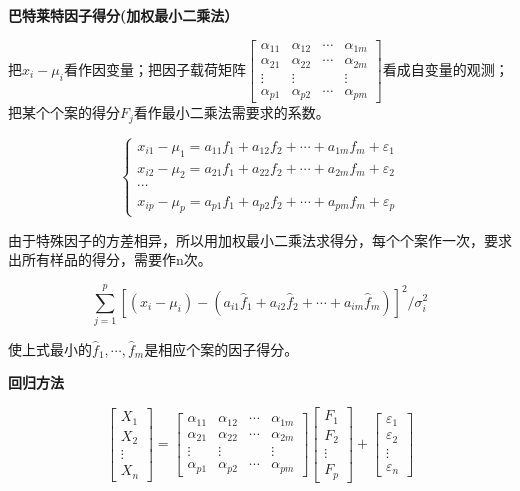 \documentclass[]{ctexbook}
\begin{document}
\textbf{巴特莱特因子得分(加权最小二乘法）}

把\(x_i-\mu_i\)看作因变量；把因子载荷矩阵\(\begin {bmatrix}\alpha_{11}&\alpha_{12}&\cdots&\alpha_{1m}\\\alpha_{21}&\alpha_{22}&\cdots&\alpha_{2m}\\\vdots&\vdots&&\vdots\\\alpha_{p1}&\alpha_{p2}&\cdots&\alpha_{pm} \end {bmatrix}\)看成自变量的观测；把某个个案的得分\(F_j\)看作最小二乘法需要求的系数。

\[\begin {cases}x_{i1}-\mu_1=a_{11}f_1+a_{12}f_2+\cdots+a_{1m}f_m+\varepsilon_1\\x_{i2}-\mu_2=a_{21}f_1+a_{22}f_2+\cdots+a_{2m}f_m+\varepsilon_2\\\cdots\\x_{ip}-\mu_p=a_{p1}f_1+a_{p2}f_2+\cdots+a_{pm}f_m+\varepsilon_p \end {cases}\]

由于特殊因子的方差相异，所以用加权最小二乘法求得分，每个个案作一次，要求出所有样品的得分，需要作n次。

\[\sum_{j=1}^p[(x_i-\mu_i)-(a_{i1}\hat f_1+a_{i2}\hat f_2+\cdots+a_{im}\hat f_m)]^2/\sigma_i^2\]

使上式最小的\(\hat f_1,\cdots,\hat f_m\)是相应个案的因子得分。

\textbf{回归方法}

\[\begin {bmatrix}X_1\\X_2\\\vdots\\X_n \end {bmatrix}=\begin {bmatrix}\alpha_{11}&\alpha_{12}&\cdots&\alpha_{1m}\\\alpha_{21}&\alpha_{22}&\cdots&\alpha_{2m}\\\vdots&\vdots&&\vdots\\\alpha_{p1}&\alpha_{p2}&\cdots&\alpha_{pm} \end {bmatrix}\begin {bmatrix}F_1\\F_2\\\vdots\\F_p \end {bmatrix}+\begin {bmatrix}\varepsilon_1\\\varepsilon_2\\\vdots\\\varepsilon_n \end {bmatrix}\]
\end{document}
